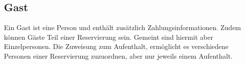 \documentclass[../../Pflichtenheft.tex]{subfiles}
\begin{document}
    \subsection{Gast}
    Ein Gast ist eine Person und enthält zusätzlich Zahlungsinformationen. Zudem können
    Gäste Teil einer Reservierung sein. Gemeint sind hiermit aber Einzelpersonen.
    Die Zuweisung zum Aufenthalt, ermöglicht es verschiedene Personen einer Reservierung zuzuordnen, aber
    nur jeweils einem Aufenthalt.
\end{document}
